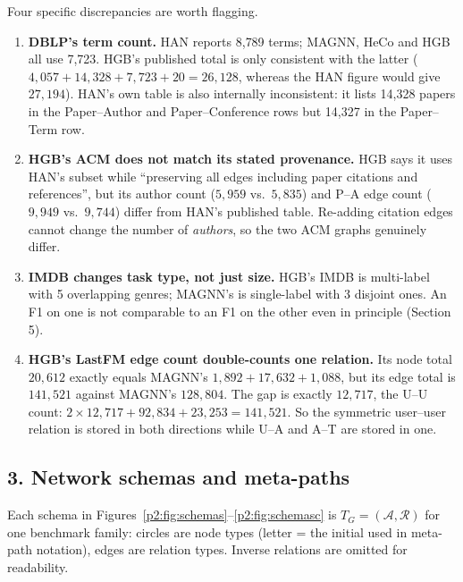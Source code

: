 \noindent Four specific discrepancies are worth flagging.
\begin{enumerate}\itemsep2pt
\item \textbf{DBLP's term count.} HAN reports 8{,}789 terms; MAGNN, HeCo and HGB all use 7{,}723.
  HGB's published total is only consistent with the latter
  ($4{,}057+14{,}328+7{,}723+20=26{,}128$, whereas the HAN figure would give $27{,}194$). HAN's own
  table is also internally inconsistent: it lists 14{,}328 papers in the Paper--Author and
  Paper--Conference rows but 14{,}327 in the Paper--Term row.
\item \textbf{HGB's ACM does not match its stated provenance.} HGB says it uses HAN's subset while
  ``preserving all edges including paper citations and references'', but its author count
  ($5{,}959$ vs.\ $5{,}835$) and P--A edge count ($9{,}949$ vs.\ $9{,}744$) differ from HAN's
  published table. Re-adding citation edges cannot change the number of \emph{authors}, so the two
  ACM graphs genuinely differ.
\item \textbf{IMDB changes task type, not just size.} HGB's IMDB is multi-label with 5 overlapping
  genres; MAGNN's is single-label with 3 disjoint ones. An F1 on one is not comparable to an F1 on
  the other even in principle (Section 5).
\item \textbf{HGB's LastFM edge count double-counts one relation.} Its node total $20{,}612$
  exactly equals MAGNN's $1{,}892+17{,}632+1{,}088$, but its edge total is $141{,}521$ against
  MAGNN's $128{,}804$. The gap is exactly $12{,}717$, the U--U count:
  $2\times12{,}717+92{,}834+23{,}253=141{,}521$. So the symmetric user--user relation is stored in
  both directions while U--A and A--T are stored in one.
\end{enumerate}

\subsection*{3. Network schemas and meta-paths}

Each schema in Figures~\ref{p2:fig:schemas}--\ref{p2:fig:schemasc} is
$T_G=(\mathcal{A},\mathcal{R})$ for one benchmark family: circles are node types (letter = the
initial used in meta-path notation), edges are relation types. Inverse relations are omitted
for readability.

